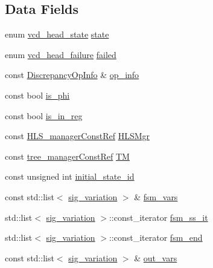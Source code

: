 \subsection*{Data Fields}
\begin{DoxyCompactItemize}
\item 
enum \hyperlink{structvcd__trace__head_ae433a47ff04aedfa841835d29f75207e}{vcd\+\_\+head\+\_\+state} \hyperlink{structvcd__trace__head_ad41fd0e7ee5a8f06fc7ef1fa8714ab24}{state}
\item 
enum \hyperlink{structvcd__trace__head_ad0e9ddff3ce422e4273ae6ccbb2a88f8}{vcd\+\_\+head\+\_\+failure} \hyperlink{structvcd__trace__head_a6395cfe9499ffeca14aba741fdd68253}{failed}
\item 
const \hyperlink{classDiscrepancyOpInfo}{Discrepancy\+Op\+Info} \& \hyperlink{structvcd__trace__head_ab9af239642c986de4ac370c4f1aac89d}{op\+\_\+info}
\item 
const bool \hyperlink{structvcd__trace__head_ae5b17f8c640f51863fa42f020ae94e66}{is\+\_\+phi}
\item 
const bool \hyperlink{structvcd__trace__head_abd309d5c7d233cb75ca3b117e54c8ccc}{is\+\_\+in\+\_\+reg}
\item 
const \hyperlink{hls__manager_8hpp_a1b481383e3beabc89bd7562ae672dd8c}{H\+L\+S\+\_\+manager\+Const\+Ref} \hyperlink{structvcd__trace__head_a0b276042c7a370e1fbba5b855a57d7f3}{H\+L\+S\+Mgr}
\item 
const \hyperlink{tree__manager_8hpp_a792e3f1f892d7d997a8d8a4a12e39346}{tree\+\_\+manager\+Const\+Ref} \hyperlink{structvcd__trace__head_a8db2070e7bd8fa8d995f034143c860ad}{TM}
\item 
const unsigned int \hyperlink{structvcd__trace__head_aabe62f6ae8b5b24732857daaa9df4b30}{initial\+\_\+state\+\_\+id}
\item 
const std\+::list$<$ \hyperlink{structsig__variation}{sig\+\_\+variation} $>$ \& \hyperlink{structvcd__trace__head_a78c41220597abaf2c6f11b2174929666}{fsm\+\_\+vars}
\item 
std\+::list$<$ \hyperlink{structsig__variation}{sig\+\_\+variation} $>$\+::const\+\_\+iterator \hyperlink{structvcd__trace__head_aa00e910431b3a8a5fca7bf6961739091}{fsm\+\_\+ss\+\_\+it}
\item 
std\+::list$<$ \hyperlink{structsig__variation}{sig\+\_\+variation} $>$\+::const\+\_\+iterator \hyperlink{structvcd__trace__head_a696d35a8e999fbf0f18e78d5312fd8bf}{fsm\+\_\+end}
\item 
const std\+::list$<$ \hyperlink{structsig__variation}{sig\+\_\+variation} $>$ \& \hyperlink{structvcd__trace__head_a4c40b23aa1c08f07ce05160a7d4e8a48}{out\+\_\+vars}

\end{DoxyCompactItemize}
